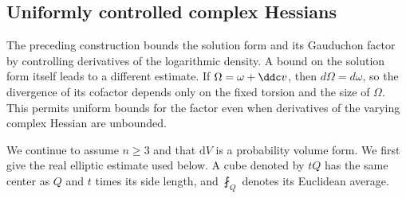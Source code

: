 \subsection{Uniformly controlled complex Hessians}
\label{sec:gaud-hessian-adjoint-bounds}

The preceding construction bounds the solution form and its Gauduchon factor by controlling derivatives of the logarithmic density. A bound on the solution form itself leads to a different estimate. If $\Omega=\omega+\ddc v$, then $d\Omega=d\omega$, so the divergence of its cofactor depends only on the fixed torsion and the size of $\Omega$. This permits uniform bounds for the factor even when derivatives of the varying complex Hessian are unbounded.

We continue to assume $n\geq3$ and that $\mathrm{d}V$ is a probability volume form. We first give the real elliptic estimate used below. A cube denoted by $tQ$ has the same center as $Q$ and $t$ times its side length, and $\fint_Q$ denotes its Euclidean average.

